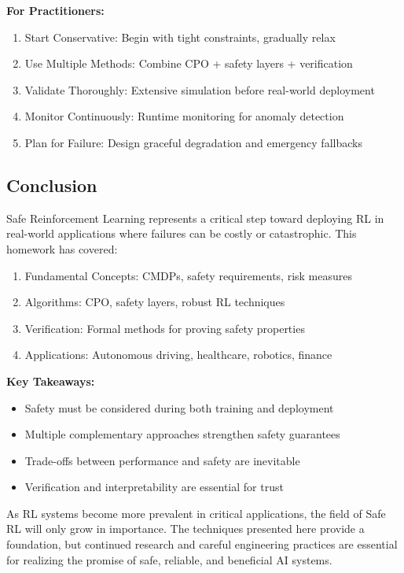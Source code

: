 \documentclass[12pt]{article}
\begin{document}
{{{{\textbf{For Practitioners:}
\begin{enumerate}
\item Start Conservative: Begin with tight constraints, gradually relax
\item Use Multiple Methods: Combine CPO + safety layers + verification
\item Validate Thoroughly: Extensive simulation before real-world deployment
\item Monitor Continuously: Runtime monitoring for anomaly detection
\item Plan for Failure: Design graceful degradation and emergency fallbacks
\end{enumerate}

\subsection{Conclusion}

Safe Reinforcement Learning represents a critical step toward deploying RL in real-world applications where failures can be costly or catastrophic. This homework has covered:

\begin{enumerate}
\item Fundamental Concepts: CMDPs, safety requirements, risk measures
\item Algorithms: CPO, safety layers, robust RL techniques
\item Verification: Formal methods for proving safety properties
\item Applications: Autonomous driving, healthcare, robotics, finance
\end{enumerate}

\textbf{Key Takeaways:}
\begin{itemize}
\item Safety must be considered during both training and deployment
\item Multiple complementary approaches strengthen safety guarantees
\item Trade-offs between performance and safety are inevitable
\item Verification and interpretability are essential for trust
\end{itemize}

As RL systems become more prevalent in critical applications, the field of Safe RL will only grow in importance. The techniques presented here provide a foundation, but continued research and careful engineering practices are essential for realizing the promise of safe, reliable, and beneficial AI systems.

}}}}
\end{document}
